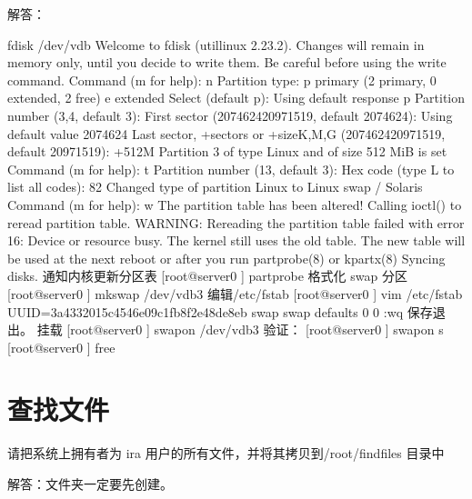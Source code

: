 \documentclass[letterpaper,10pt,english]{sphinxmanual}
\begin{document}
解答：

%
\begin{sphinxVerbatim}\PYGZsh{} fdisk /dev/vdb
Welcome to fdisk (util\PYGZhy{}linux 2.23.2).
Changes will remain in memory only, until you decide to write them. Be careful before using the write command.
Command (m for help): n
Partition type:
p   primary (2 primary, 0 extended, 2 free) e       extended
Select (default p):
Using default response p
Partition number (3,4, default 3):
First sector (2074624\PYGZhy{}20971519, default 2074624):
Using default value 2074624
Last sector, +sectors or +size\PYGZob{}K,M,G\PYGZcb{} (2074624\PYGZhy{}20971519, default 20971519): +512M
Partition 3 of type Linux and of size 512 MiB is set
Command (m for help): t
Partition number (1\PYGZhy{}3, default 3):
Hex code (type L to list all codes): 82
Changed type of partition \PYGZsq{}Linux\PYGZsq{} to \PYGZsq{}Linux swap / Solaris\PYGZsq{}
Command (m for help): w
The partition table has been altered!
Calling ioctl() to re\PYGZhy{}read partition table.
WARNING: Re\PYGZhy{}reading the partition table failed with error 16: Device or resource busy. The kernel still uses the old table. The new table will be used at the next reboot or after you run partprobe(8) or kpartx(8) Syncing disks.
通知内核更新分区表
[root@server0 \PYGZti{}]\PYGZsh{} partprobe
格式化 swap 分区
[root@server0 \PYGZti{}]\PYGZsh{} mkswap /dev/vdb3
编辑/etc/fstab
[root@server0 \PYGZti{}]\PYGZsh{} vim /etc/fstab
UUID=3a433201\PYGZhy{}5c45\PYGZhy{}46e0\PYGZhy{}9c1f\PYGZhy{}b8f2e48de8eb   swap    swap    defaults
0 0
:wq 保存退出。
挂载
[root@server0 \PYGZti{}]\PYGZsh{} swapon /dev/vdb3
验证：
[root@server0 \PYGZti{}]\PYGZsh{} swapon \PYGZhy{}s
[root@server0 \PYGZti{}]\PYGZsh{} free
\end{sphinxVerbatim}


\section{查找文件}
\label{\detokenize{rhcsa/rhcsa_7:id11}}
请把系统上拥有者为 ira 用户的所有文件，并将其拷贝到/root/findfiles 目录中

解答：文件夹一定要先创建。

%
\begin{sphinxVerbatim}[commandchars=\\\{\}]
\PYG{p}{[} \PYG{p}{]}
\PYG{p}{[} \PYG{p}{]}
\end{sphinxVerbatim}
\end{document}
